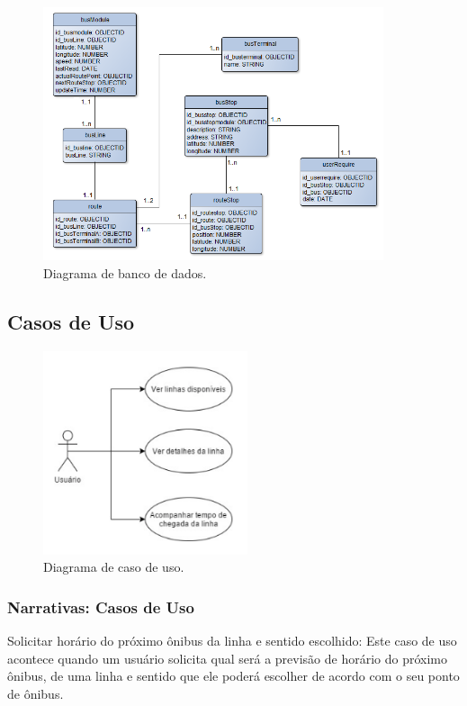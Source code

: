 \documentclass[
	12pt,				%
	oneside,			%
	a4paper,			%
	brazil				%
]{abntex2}
\begin{document}
{\begin{figure}[!h]
\centering
\includegraphics[width=10cm, center]{images/database-api.png}
\caption{Diagrama de banco de dados.}
\label{Rotulo}
\end{figure}

\newpage

\subsection{Casos de Uso}

\begin{figure}[!h]
\centering
\includegraphics[width=6cm, center]{images/use-case-diagram.png}
\caption{Diagrama de caso de uso.}
\label{Rotulo}
\end{figure}

\subsubsection{Narrativas: Casos de Uso}

Solicitar horário do próximo ônibus da linha e sentido escolhido: Este caso de uso acontece quando um usuário solicita qual será a previsão de horário do próximo ônibus, de uma linha e sentido que ele poderá escolher de acordo com o seu ponto de ônibus.

}
\end{document}
